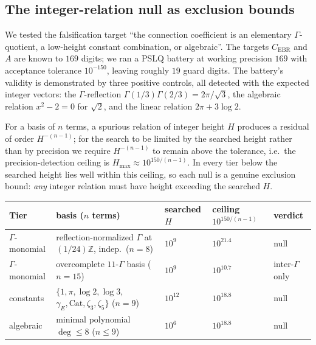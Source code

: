 \documentclass[11pt,reqno]{amsart}
\theoremstyle{plain}
\theoremstyle{definition}
\theoremstyle{remark}
\newcommand{\Z}{\mathbb{Z}}
\newcommand{\Cebr}{C_{\mathrm{EBR}}}
\begin{document}
\subsection{The integer-relation null as exclusion bounds}\label{sec:null}
We tested the falsification target ``the connection coefficient is an
elementary $\Gamma$-quotient, a low-height constant combination, or
algebraic''. The targets $\Cebr$ and $A$ are known to $169$ digits; we ran a
PSLQ battery at working precision $169$ with acceptance tolerance $10^{-150}$,
leaving roughly $19$ guard digits. The battery's validity is demonstrated by
three positive controls, all detected with the expected integer vectors: the
$\Gamma$-reflection $\Gamma(1/3)\Gamma(2/3)=2\pi/\sqrt3$, the algebraic relation
$x^{2}-2=0$ for $\sqrt2$, and the linear relation $2\pi+3\log2$.

For a basis of $n$ terms, a spurious relation of integer height $H$ produces a
residual of order $H^{-(n-1)}$; for the search to be limited by the searched
height rather than by precision we require $H^{-(n-1)}$ to remain above the
tolerance, i.e.\ the precision-detection ceiling is
$H_{\max}\approx10^{150/(n-1)}$. In every tier below the searched height lies
well within this ceiling, so each null is a genuine exclusion bound: \emph{any}
integer relation must have height exceeding the searched $H$.

\begin{center}
\footnotesize
\setlength{\tabcolsep}{4pt}
\begin{tabular}{@{}l>{\raggedright\arraybackslash}p{}lll@{}}
\toprule
Tier & basis ($n$ terms) & searched $H$ & ceiling $10^{150/(n-1)}$ & verdict \\
\midrule
$\Gamma$-monomial & reflection-normalized $\Gamma$ at $(1/24)\Z$, indep.\ ($n{=}8$)
  & $10^{9}$ & $10^{21.4}$ & null \\
$\Gamma$-monomial & overcomplete $11$-$\Gamma$ basis ($n{=}15$)
  & $10^{9}$ & $10^{10.7}$ & inter-$\Gamma$ only \\
constants & $\{1,\pi,\log2,\log3,$ $\gamma_{E},\text{Cat},\zeta_3,\zeta_5\}$ ($n{=}9$)
  & $10^{12}$ & $10^{18.8}$ & null \\
algebraic & minimal polynomial $\deg\le8$ ($n\le9$)
  & $10^{6}$ & $10^{18.8}$ & null \\
\bottomrule
\end{tabular}
\end{center}
\end{document}

